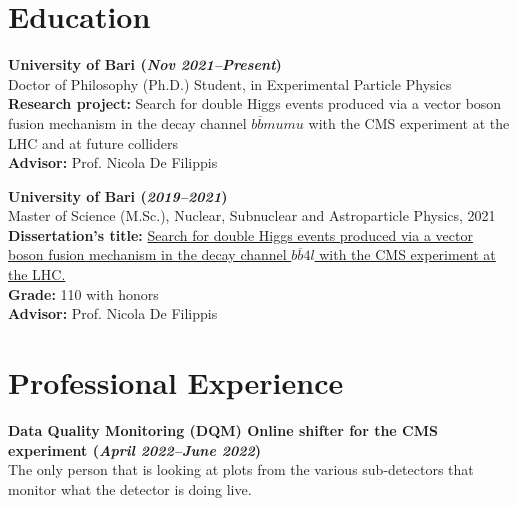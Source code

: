 \documentclass[11pt]{res}
\newcommand{\MarginText}[1]{\section{#1}\vspace{10pt}}
\begin{document}
\newcommand{\DOI}[1]{\href{https://doi.org/#1}{doi:#1}}
\begin{resume}


\MarginText{Education}

\textbf{University of Bari (\textit{Nov 2021--Present})}\\
Doctor of Philosophy (Ph.D.) Student, in Experimental Particle Physics\\
\textbf{Research project:}
Search for double Higgs events produced via a vector boson fusion mechanism in the decay channel $b\overline{b}mumu$ with the CMS experiment at the LHC and at future colliders\\
\textbf{Advisor:} Prof. Nicola De Filippis

\textbf{University of Bari (\textit{2019--2021})}\\
Master of Science (M.Sc.), Nuclear, Subnuclear and Astroparticle Physics, 2021\\
\textbf{Dissertation's title:}
    \href{https://inspirehep.net/literature/1955669}{Search for double Higgs events produced via a vector boson fusion mechanism in the decay channel $b\overline{b}4l$ with the CMS experiment at the LHC.}\\
\textbf{Grade:} 110 with honors\\
\textbf{Advisor:} Prof. Nicola De Filippis



\MarginText{Professional Experience}

\textbf{Data Quality Monitoring (DQM) Online shifter for the CMS experiment (\textit{April 2022--June 2022})}\\
The only person that is looking at plots from the various sub-detectors that monitor what the detector is doing live.


\end{resume}
\end{document}
